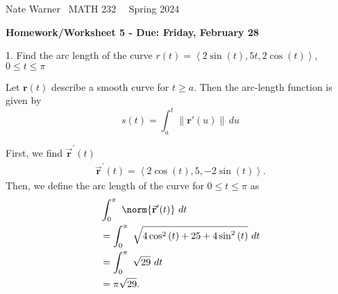 \documentclass{report}
\title{\Huge{}}
\author{\huge{Nathan Warner}}
\date{\huge{}}
\begin{document}
    \pagebreak \bigbreak \noindent
    Nate Warner \ \quad \quad \quad \quad \quad \quad \quad \quad \quad \quad \quad \quad  MATH 232 \quad  \quad \quad \quad \quad \quad \quad \quad \quad \ \ \quad \quad Spring 2024
    \begin{center}
        \textbf{Homework/Worksheet 5 - Due: Friday, February 28}
    \end{center}
    \bigbreak \noindent 

    \begin{mdframed}
        1. Find the arc length of the curve $r(t) = \left\langle 2\sin{\left(t\right)}, 5t,2\cos{\left(t\right)} \right\rangle $, $0 \leq t \leq \pi $
    \end{mdframed}
    \bigbreak \noindent 
    \begin{remark}
        Let $\mathbf{r}(t)$ describe a smooth curve for $t \geq a$. Then the arc-length function is given by
        \begin{equation}
            s(t) = \int_{a}^{t} \|\mathbf{r}'(u)\| \, du
        \end{equation}
    \end{remark}
    \bigbreak \noindent 
    First, we find $\vec{\mathbf{r}}^{\prime}(t)$
    \begin{align*}
        \vec{\mathbf{r}}^{\prime}(t) = \left\langle 2\cos{\left(t\right)}, 5, -2\sin{\left(t\right)} \right\rangle
    .\end{align*}
    \bigbreak \noindent 
    Then, we define the arc length of the curve for $0 \leq t \leq \pi $ as 
    \begin{align*}
        &\int_{0}^{\pi}\ \norm{\vec{\mathbf{r}}^{\prime}(t)}\ dt \\
        &=\int_{0}^{\pi}\ \sqrt{4\cos^{2}{\left(t\right)} + 25 + 4\sin^{2}{\left(t\right)}}\ dt \\
        &=\int_{0}^{\pi}\ \sqrt{29}\ dt \\
        &=\pi\sqrt{29}
    .\end{align*}
\end{document}
